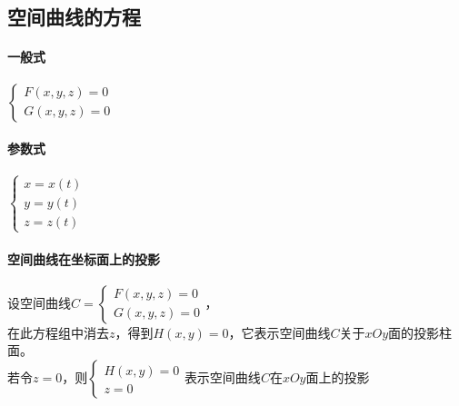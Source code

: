 \documentclass{article}
\begin{document}
\begin{flushleft}
	\subsection{空间曲线的方程}
	
	\paragraph{一般式}
	$\left\{
	\begin{array}{lcl}
	F(x,y,z)=0\\
	G(x,y,z)=0
	\end{array} \right.$\\
	
	\paragraph{参数式}
	$\left\{
	\begin{array}{lcl}
	x=x(t)\\
	y=y(t)\\
	z=z(t)
	\end{array} \right.$\\
	
	\paragraph{空间曲线在坐标面上的投影}
	设空间曲线$C=\left\{
	\begin{array}{lcl}
	F(x,y,z)=0\\
	G(x,y,z)=0
	\end{array} \right.$，\\
	在此方程组中消去$z$，得到$H(x,y)=0$，它表示空间曲线$C$关于$xOy$面的投影柱面。\\
	若令$z=0$，则$\left\{
	\begin{array}{lcl}
	H(x,y)=0\\
	z=0
	\end{array} \right.$表示空间曲线$C$在$xOy$面上的投影\\
	
	
	
\end{flushleft}
\end{document}
